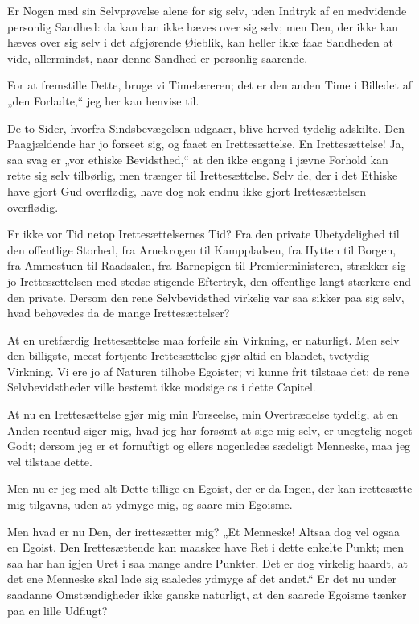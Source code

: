 \documentclass[12pt,a4paper]{book}
\newcommand{\apage}[1]{\marginnote{\footnotesize\textit{[#1]}}}
\begin{document}
Er Nogen med sin Selvprøvelse alene for sig selv, uden Indtryk af en
medvidende personlig Sandhed: da kan han ikke hæves over sig selv; men
Den, der ikke kan hæves over sig selv i det afgjørende Øieblik, kan
heller ikke faae Sandheden at vide, allermindst, naar denne Sandhed er
personlig saarende.

For at fremstille Dette, bruge vi Timelæreren; det er den anden Time i
Billedet af „den Forladte,“ jeg her kan henvise til.

De to Sider, hvorfra Sindsbevægelsen udgaaer, blive herved tydelig
adskilte. Den Paagjældende har jo forseet sig, og faaet en
Irettesættelse. En Irettesættelse! Ja, saa svag er „vor ethiske
Bevidsthed,“ at den ikke engang i jævne Forhold kan rette sig selv
tilbørlig, men trænger til Irettesættelse. Selv de, der i det Ethiske
have gjort Gud overflødig, have dog nok endnu ikke gjort Irettesættelsen
overflødig.
 \apage{128}

Er ikke vor Tid netop Irettesættelsernes Tid? Fra den private
Ubetydelighed til den offentlige Storhed, fra Arnekrogen til
Kamppladsen, fra Hytten til Borgen, fra Ammestuen til Raadsalen, fra
Barnepigen til Premierministeren, strækker sig jo Irettesættelsen med
stedse stigende Eftertryk, den offentlige langt stærkere end den
private. Dersom den rene Selvbevidsthed virkelig var saa sikker paa sig
selv, hvad behøvedes da de mange Irettesættelser?

At en uretfærdig Irettesættelse maa forfeile sin Virkning, er naturligt.
Men selv den billigste, meest fortjente Irettesættelse gjør altid en
blandet, tvetydig Virkning. Vi ere jo af Naturen tilhobe Egoister; vi
kunne frit tilstaae det: de rene Selvbevidstheder ville bestemt ikke
modsige os i dette Capitel.

At nu en Irettesættelse gjør mig min Forseelse, min Overtrædelse
tydelig, at en Anden reentud siger mig, hvad jeg har forsømt at sige mig
selv, er unegtelig noget Godt; dersom jeg er et fornuftigt og ellers
nogenledes sædeligt Menneske, maa jeg vel tilstaae dette.

Men nu er jeg med alt Dette tillige en Egoist, der er da Ingen, der kan
irettesætte mig tilgavns, uden at ydmyge mig, og saare min Egoisme.

Men hvad er nu Den, der irettesætter mig? „Et Menneske! Altsaa dog vel
ogsaa en Egoist. Den Irettesættende kan maaskee have Ret i dette
enkelte Punkt; men saa har han igjen Uret i saa mange andre Punkter. Det
er dog virkelig haardt, at det ene Menneske skal lade sig saaledes
ydmyge af det andet.“ Er det nu under saadanne Omstændigheder ikke
ganske naturligt, at den saarede Egoisme tænker paa en lille Udflugt?
\end{document}
